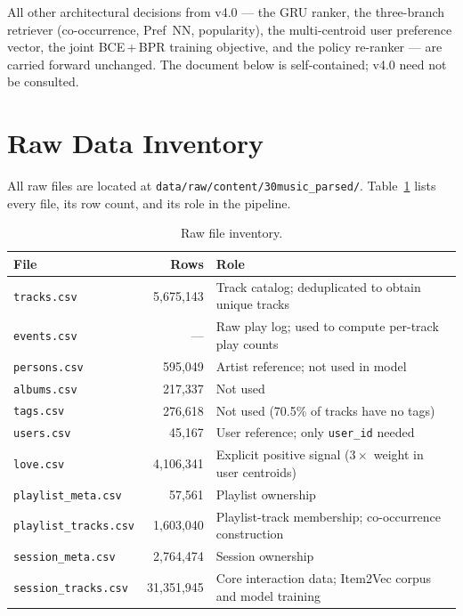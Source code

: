 \documentclass[11pt]{article}
\begin{document}
All other architectural decisions from v4.0 --- the GRU ranker, the
three-branch retriever (co-occurrence, Pref~NN, popularity), the
multi-centroid user preference vector, the joint BCE\,+\,BPR training
objective, and the policy re-ranker --- are carried forward unchanged.
The document below is self-contained; v4.0 need not be consulted.

\section{Raw Data Inventory}

All raw files are located at
\texttt{data/raw/content/30music\_parsed/}.
Table~\ref{tab:raw_inventory} lists every file, its row count, and
its role in the pipeline.

\begin{table}[H]
\centering
\caption{Raw file inventory.}
\label{tab:raw_inventory}
\begin{tabular}{lrl}
\toprule
\textbf{File} & \textbf{Rows} & \textbf{Role} \\
\midrule
\texttt{tracks.csv}           & 5,675,143  & Track catalog; deduplicated to obtain unique tracks \\
\texttt{events.csv}           & ---        & Raw play log; used to compute per-track play counts \\
\texttt{persons.csv}          & 595,049    & Artist reference; not used in model \\
\texttt{albums.csv}           & 217,337    & Not used \\
\texttt{tags.csv}             & 276,618    & Not used (70.5\% of tracks have no tags) \\
\texttt{users.csv}            & 45,167     & User reference; only \texttt{user\_id} needed \\
\texttt{love.csv}             & 4,106,341  & Explicit positive signal ($3\times$ weight in user centroids) \\
\texttt{playlist\_meta.csv}   & 57,561     & Playlist ownership \\
\texttt{playlist\_tracks.csv} & 1,603,040  & Playlist-track membership; co-occurrence construction \\
\texttt{session\_meta.csv}    & 2,764,474  & Session ownership \\
\texttt{session\_tracks.csv}  & 31,351,945 & Core interaction data; Item2Vec corpus and model training \\
\bottomrule
\end{tabular}
\end{table}
\end{document}
